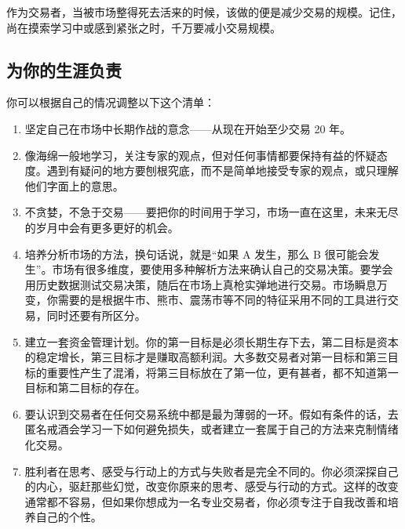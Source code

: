 作为交易者，当被市场整得死去活来的时候，该做的便是减少交易的规模。记住，尚在摸索学习中或感到紧张之时，千万要减小交易规模。

\subsection*{为你的生涯负责}
你可以根据自己的情况调整以下这个清单：
\begin{enumerate}
    \item 坚定自己在市场中长期作战的意念——从现在开始至少交易 20 年。
    \item 像海绵一般地学习，关注专家的观点，但对任何事情都要保持有益的怀疑态度。遇到有疑问的地方要刨根究底，而不是简单地接受专家的观点，或只理解他们字面上的意思。
    \item 不贪婪，不急于交易——要把你的时间用于学习，市场一直在这里，未来无尽的岁月中会有更多更好的机会。
    \item 培养分析市场的方法，换句话说，就是“如果 A 发生，那么 B 很可能会发生”。市场有很多维度，要使用多种解析方法来确认自己的交易决策。要学会用历史数据测试交易决策，随后在市场上真枪实弹地进行交易。市场瞬息万变，你需要的是根据牛市、熊市、震荡市等不同的特征采用不同的工具进行交易，同时还要有所区分。
    \item 建立一套资金管理计划。你的第一目标是必须长期生存下去，第二目标是资本的稳定增长，第三目标才是赚取高额利润。大多数交易者对第一目标和第三目标的重要性产生了混淆，将第三目标放在了第一位，更有甚者，都不知道第一目标和第二目标的存在。
    \item 要认识到交易者在任何交易系统中都是最为薄弱的一环。假如有条件的话，去匿名戒酒会学习一下如何避免损失，或者建立一套属于自己的方法来克制情绪化交易。
    \item 胜利者在思考、感受与行动上的方式与失败者是完全不同的。你必须深探自己的内心，驱赶那些幻觉，改变你原来的思考、感受与行动的方式。这样的改变通常都不容易，但如果你想成为一名专业交易者，你必须专注于自我改善和培养自己的个性。
\end{enumerate}